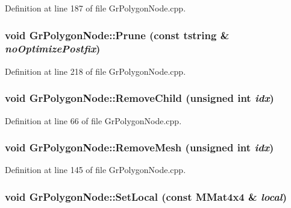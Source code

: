 Definition at line 187 of file GrPolygonNode.cpp.\hypertarget{class_gr_polygon_node_8719d2c19a3d078a1c8e6928c4c691e9}{
\subsubsection[{Prune}]{\setlength{\rightskip}{0pt plus 5cm}void GrPolygonNode::Prune (const {\bf tstring} \& {\em noOptimizePostfix})}}
\label{class_gr_polygon_node_8719d2c19a3d078a1c8e6928c4c691e9}




Definition at line 218 of file GrPolygonNode.cpp.\hypertarget{class_gr_polygon_node_9970c20562d88e8f9b23a8ce08e3bb24}{
\subsubsection[{RemoveChild}]{\setlength{\rightskip}{0pt plus 5cm}void GrPolygonNode::RemoveChild (unsigned int {\em idx})}}
\label{class_gr_polygon_node_9970c20562d88e8f9b23a8ce08e3bb24}




Definition at line 66 of file GrPolygonNode.cpp.\hypertarget{class_gr_polygon_node_60a8d0b1e0d13e8801e73abda8a3ce58}{
\subsubsection[{RemoveMesh}]{\setlength{\rightskip}{0pt plus 5cm}void GrPolygonNode::RemoveMesh (unsigned int {\em idx})}}
\label{class_gr_polygon_node_60a8d0b1e0d13e8801e73abda8a3ce58}




Definition at line 145 of file GrPolygonNode.cpp.\hypertarget{class_gr_polygon_node_19ee4a38724974d06ee66b619cf0a2e1}{
\subsubsection[{SetLocal}]{\setlength{\rightskip}{0pt plus 5cm}void GrPolygonNode::SetLocal (const {\bf MMat4x4} \& {\em local})}}
\label{class_gr_polygon_node_19ee4a38724974d06ee66b619cf0a2e1}




